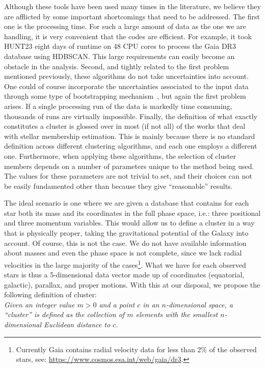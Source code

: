 \documentclass[fleqn,usenatbib]{mnras}
\begin{document}
Although these tools have been used many times in the literature, we
believe they are afflicted by some important shortcomings that need to be
addressed. The first one is the processing time. For such a large amount of data
as the one we are handling, it is very convenient that the codes are efficient.
For example, it took HUNT23 eight days of runtime on 48 CPU cores to process the
Gaia DR3 database using HDBSCAN. This large requirements can easily become an
obstacle in the analysis.
%
Second, and tightly related to the first problem mentioned previously, these
algorithms do not take uncertainties into account. One could of course
incorporate the uncertainties associated to the input data through some type of
bootstrapping mechanism~\citep{Efron_1979}, but again the first problem arises.
If a single processing run of the data is markedly time consuming, thousands of
runs are virtually impossible.
%
Finally, the definition of what exactly constitutes a cluster is glossed over
in most (if not all) of the works that deal with stellar membership estimation.
This is mainly because there is no standard definition across different
clustering algorithms, and each one employs a different one. Furthermore, when
applying these algorithms, the selection of cluster members depends on a number
of parameters unique to the method being used. The values for these parameters
are not trivial to set, and their choices can not be easily fundamented other
than because they give ``reasonable'' results.

The ideal scenario is one where we are given a database that contains for
each star both its mass and its coordinates in the full phase space, i.e.: three
positional and three momentum variables. This would allow us to define a cluster
in a way that is physically proper, taking the gravitational potential of the
Galaxy into account. Of course, this is not the case. We do not have available
information about masses and even the phase space is not complete,
since we lack radial velocities in the large majority of the
cases\footnote{Currently Gaia contains radial velocity data for less than 2\% of
the observed stars, see: \url{https://www.cosmos.esa.int/web/gaia/dr3}.}. What
we have for each observed stars is thus a 5-dimensional data vector made up of
coordinates (equatorial, galactic), parallax, and proper motions. With this at
our disposal, we propose the following definition of cluster:\\

\noindent\emph{Given an integer value $m>0$ and a point $c$ in an
$n$-dimensional space, a ``cluster'' is defined as the collection of $m$
elements with the smallest $n$-dimensional Euclidean distance to $c$.}\\
\end{document}
